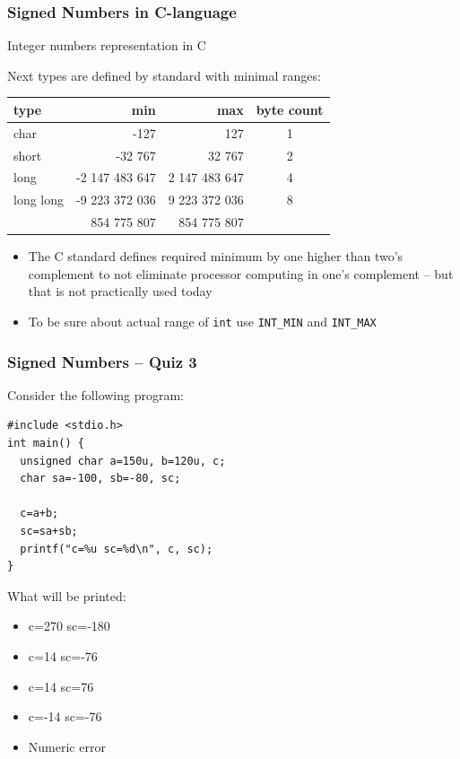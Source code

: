 \documentclass{beamer}
\begin{document}
\begin{frame}
\frametitle{Signed Numbers in C-language}
Integer numbers representation in C

Next types are defined by standard with minimal ranges:
\begin{tabular}{|l|r|r|c|}\hline
type & min & max & byte count\\ \hline
char & -127 & 127 & 1 \\ \hline
short & -32 767 & 32 767 & 2 \\ \hline
long & -2 147 483 647 & 2 147 483 647 & 4 \\ \hline
long long & -9 223 372 036 & 9 223 372 036  & 8 \\ 
 & \phantom{xx} 854 775 807 & \phantom{xx}854 775 807 &  \\ \hline
\end{tabular}

\begin{itemize}
\item The C standard defines required minimum by one higher than two's complement to not eliminate processor computing in one's complement -- but that is not practically used today
\item To be sure about actual range of \texttt{int} use \texttt{INT\_MIN} and \texttt{INT\_MAX}
\end{itemize}

\end{frame}


\begin{frame}[fragile, shrink=5]
\frametitle{Signed Numbers -- Quiz 3}

Consider the following program:
\begin{verbatim}
#include <stdio.h>
int main() {
  unsigned char a=150u, b=120u, c;
  char sa=-100, sb=-80, sc;
  
  c=a+b;
  sc=sa+sb;
  printf("c=%u sc=%d\n", c, sc);
}
\end{verbatim}

What will be printed:
\begin{itemize}
\item[A] c=270 sc=-180
\item[B] c=14 sc=-76
\item[C] c=14 sc=76
\item[D] c=-14 sc=-76
\item[E] Numeric error
\end{itemize}
\end{frame}
\end{document}

